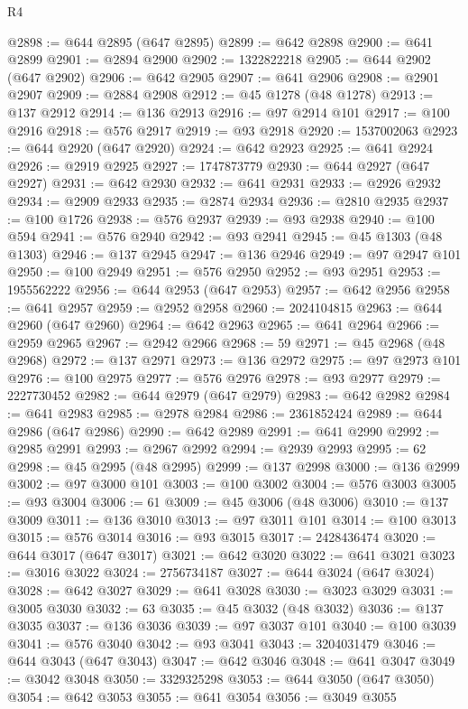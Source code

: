 \begin{lexlean}{R4}
\begin{coremodule}
@2898 := @644 @2895 (@647 @2895)
@2899 := @642 @2898
@2900 := @641 @2899
@2901 := @2894 @2900
@2902 := 1322822218
@2905 := @644 @2902 (@647 @2902)
@2906 := @642 @2905
@2907 := @641 @2906
@2908 := @2901 @2907
@2909 := @2884 @2908
@2912 := @45 @1278 (@48 @1278)
@2913 := @137 @2912
@2914 := @136 @2913
@2916 := @97 @2914 @101
@2917 := @100 @2916
@2918 := @576 @2917
@2919 := @93 @2918
@2920 := 1537002063
@2923 := @644 @2920 (@647 @2920)
@2924 := @642 @2923
@2925 := @641 @2924
@2926 := @2919 @2925
@2927 := 1747873779
@2930 := @644 @2927 (@647 @2927)
@2931 := @642 @2930
@2932 := @641 @2931
@2933 := @2926 @2932
@2934 := @2909 @2933
@2935 := @2874 @2934
@2936 := @2810 @2935
@2937 := @100 @1726
@2938 := @576 @2937
@2939 := @93 @2938
@2940 := @100 @594
@2941 := @576 @2940
@2942 := @93 @2941
@2945 := @45 @1303 (@48 @1303)
@2946 := @137 @2945
@2947 := @136 @2946
@2949 := @97 @2947 @101
@2950 := @100 @2949
@2951 := @576 @2950
@2952 := @93 @2951
@2953 := 1955562222
@2956 := @644 @2953 (@647 @2953)
@2957 := @642 @2956
@2958 := @641 @2957
@2959 := @2952 @2958
@2960 := 2024104815
@2963 := @644 @2960 (@647 @2960)
@2964 := @642 @2963
@2965 := @641 @2964
@2966 := @2959 @2965
@2967 := @2942 @2966
@2968 := 59
@2971 := @45 @2968 (@48 @2968)
@2972 := @137 @2971
@2973 := @136 @2972
@2975 := @97 @2973 @101
@2976 := @100 @2975
@2977 := @576 @2976
@2978 := @93 @2977
@2979 := 2227730452
@2982 := @644 @2979 (@647 @2979)
@2983 := @642 @2982
@2984 := @641 @2983
@2985 := @2978 @2984
@2986 := 2361852424
@2989 := @644 @2986 (@647 @2986)
@2990 := @642 @2989
@2991 := @641 @2990
@2992 := @2985 @2991
@2993 := @2967 @2992
@2994 := @2939 @2993
@2995 := 62
@2998 := @45 @2995 (@48 @2995)
@2999 := @137 @2998
@3000 := @136 @2999
@3002 := @97 @3000 @101
@3003 := @100 @3002
@3004 := @576 @3003
@3005 := @93 @3004
@3006 := 61
@3009 := @45 @3006 (@48 @3006)
@3010 := @137 @3009
@3011 := @136 @3010
@3013 := @97 @3011 @101
@3014 := @100 @3013
@3015 := @576 @3014
@3016 := @93 @3015
@3017 := 2428436474
@3020 := @644 @3017 (@647 @3017)
@3021 := @642 @3020
@3022 := @641 @3021
@3023 := @3016 @3022
@3024 := 2756734187
@3027 := @644 @3024 (@647 @3024)
@3028 := @642 @3027
@3029 := @641 @3028
@3030 := @3023 @3029
@3031 := @3005 @3030
@3032 := 63
@3035 := @45 @3032 (@48 @3032)
@3036 := @137 @3035
@3037 := @136 @3036
@3039 := @97 @3037 @101
@3040 := @100 @3039
@3041 := @576 @3040
@3042 := @93 @3041
@3043 := 3204031479
@3046 := @644 @3043 (@647 @3043)
@3047 := @642 @3046
@3048 := @641 @3047
@3049 := @3042 @3048
@3050 := 3329325298
@3053 := @644 @3050 (@647 @3050)
@3054 := @642 @3053
@3055 := @641 @3054
@3056 := @3049 @3055

\end{coremodule}
\end{lexlean}
